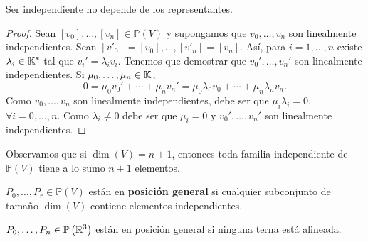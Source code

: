 \begin{lema}
Ser independiente no depende de los representantes.
\end{lema}
\begin{proof}
	Sean $\displaystyle [v_{0}], \ldots, [v_{n}] \in \mathbb{P}\left(V\right)$ y supongamos que $\displaystyle v_{0}, \ldots, v_{n} $ son linealmente independientes. Sean $\displaystyle [v'_{0}] = [v_{0}], \ldots, [v'_{n}] = [v_{n}] $. Así, para $\displaystyle i = 1, \ldots, n $ existe $\displaystyle \lambda_{i} \in \mathbb{K}^{*} $ tal que $\displaystyle v_{i}' = \lambda_{i}v_{i} $. 
	Tenemos que demostrar que $\displaystyle v_{0}', \ldots, v_{n}' $ son linealmente independientes. Si $\displaystyle \mu_{0}, \ldots, \mu_{n} \in \mathbb{K} $,
	\[0 = \mu_{0}v_{0}' + \cdots + \mu_{n}v_{n}' = \mu_{0}\lambda_{0}v_{0} + \cdots + \mu_{n}\lambda_{n}v_{n} .\]
	Como $\displaystyle v_{0}, \ldots, v_{n} $ son linealmente independientes, debe ser que $\displaystyle \mu_{i}\lambda_{i} = 0 $, $\displaystyle \forall i = 0, \ldots, n $. Como $\displaystyle \lambda_{i} \neq 0 $ debe ser que $\displaystyle \mu_{i} = 0 $ y $\displaystyle v_{0}', \ldots, v_{n}' $ son linealmente independientes.
\end{proof}
\begin{observation}
Observamos que si $\displaystyle \dim\left(V\right) = n +1$, entonces toda familia independiente de $\displaystyle \mathbb{P}\left(V\right) $ tiene a lo sumo $\displaystyle n +1 $ elementos.
\end{observation}
\begin{definition}
$\displaystyle P_{0}, \ldots, P_{r} \in \mathbb{P}\left(V\right) $ están en \textbf{posición general} si cualquier subconjunto de tamaño $\displaystyle \dim\left(V\right) $ contiene elementos independientes. 
\end{definition}
\begin{eg}
$\displaystyle P_{0}, \ldots, P_{n} \in \mathbb{P}\left(\mathbb{R}^{3}\right) $ están en posición general si ninguna terna está alineada. 
\end{eg}

